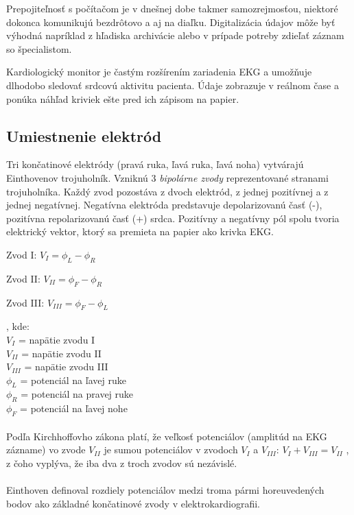 \documentclass[titlepage,12pt]{article}
\begin{document}
Prepojiteľnosť s počítačom je v dnešnej dobe takmer samozrejmosťou, niektoré dokonca komunikujú bezdrôtovo a aj na diaľku. Digitalizácia údajov môže byť výhodná napríklad z hľadiska archivácie alebo v prípade potreby zdieľať záznam so špecialistom.

Kardiologický monitor je častým rozšírením zariadenia EKG a umožňuje dlhodobo sledovať srdcovú aktivitu pacienta. Údaje zobrazuje v reálnom čase a ponúka náhľad kriviek ešte pred ich zápisom na papier.


\newpage

\subsection{Umiestnenie elektród}
Tri končatinové elektródy (pravá ruka, ľavá ruka, ľavá noha)  vytvárajú Einthovenov trojuholník. Vzniknú 3 \emph{bipolárne zvody} reprezentované stranami trojuholníka. Každý zvod pozostáva \linebreak z dvoch elektród, z jednej pozitívnej a z jednej negatívnej. Negatívna elektróda predstavuje depolarizovanú časť (-), pozitívna repolarizovanú časť (+) srdca. Pozitívny a negatívny pól spolu tvoria elektrický vektor, ktorý sa premieta na papier ako krivka EKG.

\begin{description}
	\item Zvod I: \tabto{1cm} $V_{I} = \phi_L - \phi_R$
	\item Zvod II: \tabto{1cm} $V_{II} = \phi_F - \phi_R$
	\item Zvod III:	\tabto{1cm} $V_{III} = \phi_F - \phi_L$
\end{description}
, kde: \\
\tabto{1cm} $V_{I}$ = napätie zvodu I\\
\tabto{1cm} $V_{II}$ = napätie zvodu II\\
\tabto{1cm} $V_{III}$ = napätie zvodu III\\
\tabto{1cm} $\phi_L$ = potenciál na ľavej ruke\\
\tabto{1cm} $\phi_R$ = potenciál na pravej ruke\\
\tabto{1cm} $\phi_F$ = potenciál na ľavej nohe\\
\\
Podľa Kirchhoffovho zákona platí, že veľkosť potenciálov (amplitúd na EKG zázname) vo zvode $V_{II}$ je sumou potenciálov v zvodoch $V_{I}$ a  $V_{III}$:
\tabto{1cm} $V_{I} + V_{III} = V_{II}$
, z čoho vyplýva, že iba dva z troch zvodov sú nezávislé.
\\
\\
Einthoven definoval rozdiely potenciálov medzi troma pármi horeuvedených bodov ako základné končatinové zvody v elektrokardiografii.
\end{document}
